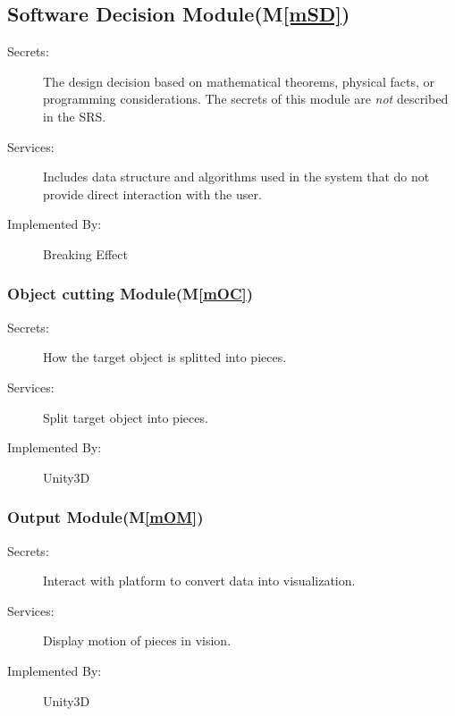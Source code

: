 \documentclass[12pt, titlepage]{article}
\newcommand{\mref}[1]{M\ref{#1}}
\begin{document}
	\subsection{Software Decision Module(\mref{mSD})}
	
	\begin{description}
		\item[Secrets:] The design decision based on mathematical theorems, physical
		facts, or programming considerations. The secrets of this module are
		\emph{not} described in the SRS.
		\item[Services:] Includes data structure and algorithms used in the system that
		do not provide direct interaction with the user. 
		\item[Implemented By:] Breaking Effect
	\end{description}
	
	\subsubsection{Object cutting Module(\mref{mOC})}
	
	\begin{description}
		\item[Secrets:] How the target object is splitted into pieces.
		\item[Services:] Split target object into pieces.
		\item[Implemented By:] Unity3D
	\end{description}
	
	\subsubsection{Output Module(\mref{mOM})}
	
	\begin{description}
		\item[Secrets:] Interact with platform to convert data into visualization.
		\item[Services:] Display motion of pieces in vision.
		\item[Implemented By:] Unity3D
		\end{description}
	
\end{document}
